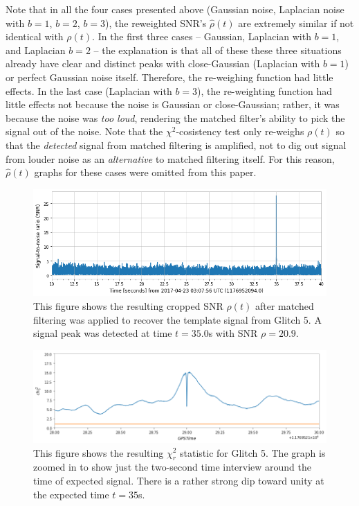\documentclass[preprint,
letterpaper,
 amsmath,amssymb,
 aps,
]{revtex4-2}
\begin{document}
Note that in all the four cases presented above (Gaussian noise, Laplacian noise with $b=1$, $b=2$, $b=3$), the reweighted SNR's $\hat{\rho}(t)$ are extremely similar if not identical with $\rho(t)$. In the first three cases – Gaussian, Laplacian with $b=1$, and Laplacian $b=2$ – the explanation is that all of these these three situations already have clear and distinct peaks with close-Gaussian (Laplacian with $b=1$) or perfect Gaussian noise itself. Therefore, the re-weighing function had little effects. In the last case (Laplacian with $b=3$), the re-weighting function had little effects not because the noise is Gaussian or close-Gaussian; rather, it was because the noise was \textit{too loud}, rendering the matched filter's ability to pick the signal out of the noise. Note that the $\chi^2$-cosistency test only re-weighs $\rho(t)$ so that the \textit{detected} signal from matched filtering is amplified, not to dig out signal from louder noise as an \textit{alternative} to matched filtering itself. For this reason, $\hat{\rho}(t)$ graphs for these cases were omitted from this paper.

\begin{widetext}

\begin{figure}[t]
\includegraphics[width = .9\textwidth]{glitch 5 template 1.png}
\caption{This figure shows the resulting cropped SNR $\rho(t)$ after matched filtering was applied to recover the template signal from Glitch 5. A signal peak was detected at time $t = 35.0$s with SNR $\rho = 20.9$.}
\centering
\end{figure}

\begin{figure}
\includegraphics[width = .9\textwidth]{chi2 glitch 5.png}
\caption{This figure shows the resulting $\chi^2_r$ statistic for Glitch 5. The graph is zoomed in to show just the two-second time interview around the time of expected signal. There is a rather strong dip toward unity at the expected time $t=35$s.}
\centering
\end{figure} 

\end{widetext}
\end{document}
